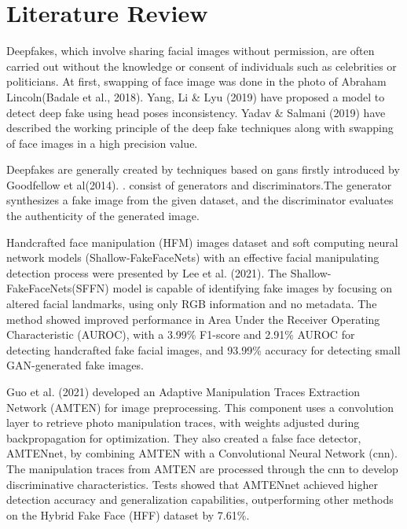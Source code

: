 \chapter{Literature Review}
Deepfakes, which involve sharing facial images without permission, are often carried out without the knowledge or consent of individuals such as celebrities or politicians. At first, swapping of face image was done in the photo of Abraham Lincoln(Badale et al., 2018)\cite{badale2018deep}. Yang, Li \& Lyu (2019)\cite{yang2019exposing} have proposed a model to detect deep fake using head poses inconsistency. Yadav \& Salmani (2019)\cite{yadav2019deepfake} have described the working principle of the deep fake techniques along with swapping of face images in a high precision value.

Deepfakes are generally created by techniques based on
\acrfull*{gans} firstly introduced
by Goodfellow et al(2014). \cite{goodfellow2014generative}.  consist of generators and discriminators.The generator synthesizes a fake image from the given dataset, and the discriminator evaluates the authenticity of the generated image.

Handcrafted face manipulation (HFM) images dataset and soft computing neural network models (Shallow-FakeFaceNets) with an effective facial manipulating detection process were presented by Lee et al. (2021)\cite{lee2021detecting}. The Shallow-FakeFaceNets(SFFN) model is capable of identifying fake images by focusing on altered facial landmarks, using only RGB information and no metadata. The method showed improved performance in Area Under the Receiver Operating Characteristic (AUROC), with a 3.99\% F1-score and 2.91\% AUROC for detecting handcrafted fake facial images, and 93.99\% accuracy for detecting small GAN-generated fake images.

Guo et al. (2021) \cite{guo2021fake} developed an Adaptive Manipulation Traces Extraction Network (AMTEN) for image preprocessing. This component uses a convolution layer to retrieve photo manipulation traces, with weights adjusted during backpropagation for optimization. They also created a false face detector, AMTENnet, by combining AMTEN with a Convolutional Neural Network (\acrshort{cnn}). The manipulation traces from AMTEN are processed through the \acrshort{cnn} to develop discriminative characteristics. Tests showed that AMTENnet achieved higher detection accuracy and generalization capabilities, outperforming other methods on the Hybrid Fake Face (HFF) dataset by 7.61\%.

